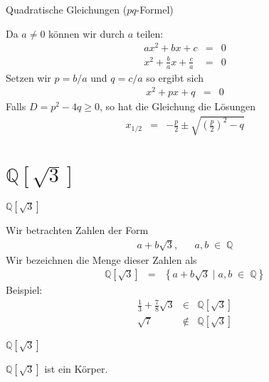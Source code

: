 \documentclass[german]{beamer}
\newcommand{\bq}{\begin{eqnarray*}}
\newcommand{\eq}{\end{eqnarray*}}
\begin{document}
\begin{frame}{Quadratische Gleichungen ($p q$-Formel)}

Da $a\neq 0$ k\"onnen wir durch $a$ teilen:
\bq
 a x^2 + b x + c & = & 0
 \nonumber \\
 x^2 + \frac{b}{a} x + \frac{c}{a} & = & 0
\eq
Setzen wir $p = b/a$ und $q=c/a$ so ergibt sich
\bq
 x^2 + p x + q & = & 0
\eq
Falls $D=p^2-4q \ge 0$, so hat die Gleichung die L\"osungen 
\bq
 x_{1/2}
 & = &
 -\frac{p}{2} \pm \sqrt{\left(\frac{p}{2}\right)^2 - q}
\eq

\end{frame}


\section{$\mathbb{Q}[\sqrt{3}]$}

\frame{\sectionpage}

\begin{frame}{$\mathbb{Q}[\sqrt{3}]$}

Wir betrachten Zahlen der Form
\bq
 a + b \sqrt{3},
 & & 
 a,b \; \in \; \mathbb{Q}
\eq
Wir bezeichnen die Menge dieser Zahlen als
\bq
 \mathbb{Q}[\sqrt{3}]
 & = &
 \left\{
  a + b \sqrt{3}
  \; | \; a,b \; \in \; \mathbb{Q}
 \right\}
\eq
Beispiel:
\bq
 \frac{1}{3} + \frac{7}{8} \sqrt{3}
 & \in & \mathbb{Q}[\sqrt{3}]
 \nonumber \\
 \sqrt{7} & \notin &
 \mathbb{Q}[\sqrt{3}]
\eq

\end{frame}

\begin{frame}{$\mathbb{Q}[\sqrt{3}]$}

\begin{theorem}
$\mathbb{Q}[\sqrt{3}]$ ist ein K\"orper.
\end{theorem}
\end{frame}
\end{document}
